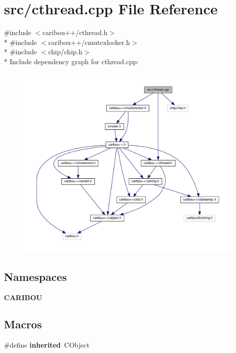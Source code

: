 \section{src/cthread.cpp File Reference}
\label{cthread_8cpp}
{\ttfamily \#include $<$caribou++/cthread.\+h$>$}\\*
{\ttfamily \#include $<$caribou++/cmutexlocker.\+h$>$}\\*
{\ttfamily \#include $<$chip/chip.\+h$>$}\\*
Include dependency graph for cthread.\+cpp\+:
\nopagebreak
\begin{figure}[H]
\begin{center}
\leavevmode
\includegraphics[width=350pt]{cthread_8cpp__incl}
\end{center}
\end{figure}
\subsection*{Namespaces}
\begin{DoxyCompactItemize}
\item 
 {\bf C\+A\+R\+I\+B\+OU}
\end{DoxyCompactItemize}
\subsection*{Macros}
\begin{DoxyCompactItemize}
\item 
\#define {\bf inherited}~C\+Object
\end{DoxyCompactItemize}
